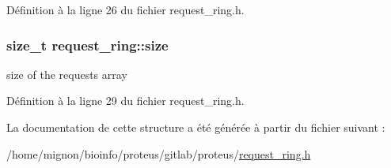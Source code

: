 Définition à la ligne 26 du fichier request\+\_\+ring.\+h.

\hypertarget{structrequest__ring_ad3a1e317fbca2bd780030d8a94b4eff8}{
\subsubsection[{size}]{\setlength{\rightskip}{0pt plus 5cm}size\+\_\+t request\+\_\+ring\+::size}}\label{structrequest__ring_ad3a1e317fbca2bd780030d8a94b4eff8}
size of the requests array 

Définition à la ligne 29 du fichier request\+\_\+ring.\+h.



La documentation de cette structure a été générée à partir du fichier suivant \+:\begin{DoxyCompactItemize}
\item 
/home/mignon/bioinfo/proteus/gitlab/proteus/\hyperlink{request__ring_8h}{request\+\_\+ring.\+h}\end{DoxyCompactItemize}
